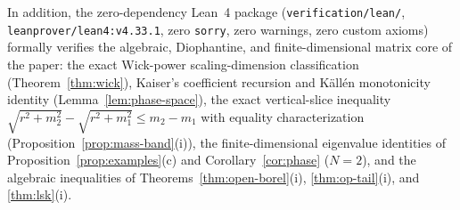 \documentclass[11pt,a4paper]{article}
\theoremstyle{definition}
\theoremstyle{remark}
\begin{document}
In addition, the zero-dependency Lean~4 package (\texttt{verification/lean/}, \texttt{leanprover/lean4:v4.33.1}, zero \texttt{sorry}, zero warnings, zero custom axioms) formally verifies the algebraic, Diophantine, and finite-dimensional matrix core of the paper: the exact Wick-power scaling-dimension classification (Theorem~\ref{thm:wick}), Kaiser's coefficient recursion and K\"all\'en monotonicity identity (Lemma~\ref{lem:phase-space}), the exact vertical-slice inequality $\sqrt{r^2+m_2^2}-\sqrt{r^2+m_1^2}\le m_2-m_1$ with equality characterization (Proposition~\ref{prop:mass-band}(i)), the finite-dimensional eigenvalue identities of Proposition~\ref{prop:examples}(c) and Corollary~\ref{cor:phase} ($N=2$), and the algebraic inequalities of Theorems~\ref{thm:open-borel}(i), \ref{thm:op-tail}(i), and \ref{thm:lsk}(i).
\end{document}
